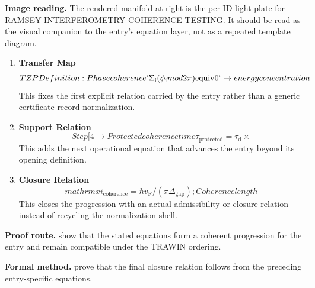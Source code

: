 \begin{samepage}
\noindent\begin{minipage}[t]{0.45\linewidth}
\vspace{0pt}
\raggedright
\scriptsize\textbf{Image reading.} The rendered manifold at right is the per-ID light plate for RAMSEY INTERFEROMETRY COHERENCE TESTING. It should be read as the visual companion to the entry's equation layer, not as a repeated template diagram.\par
\end{minipage}\hfill
\begin{minipage}[t]{0.53\linewidth}
\vspace*{-0.10in}
\raggedright
{}
\end{minipage}
\end{samepage}

\clearpage


\begin{enumerate}[leftmargin=1.6em,itemsep=9pt,topsep=6pt]
\item \textbf{Transfer Map}
\[
TZP Definition: Phase coherence `\Sigma_{\mathrm{i}}(\phi_{\mathrm{i}} mod 2\pi) \mathrm{equiv} 0` \to energy concentration
\]
This fixes the first explicit relation carried by the entry rather than a generic certificate record normalization.

\item \textbf{Support Relation}
\[
Step[4 \to Protected coherence time \tau_{\mathrm{protected}} = \tau_{\mathrm{d}} \times
\]
This adds the next operational equation that advances the entry beyond its opening definition.

\item \textbf{Closure Relation}
\[
mathrm{xi}_{\mathrm{coherence}} = \hbar v_{\mathrm{F}}/(\pi \Delta_{\mathrm{gap}}); Coherence length
\]
This closes the progression with an actual admissibility or closure relation instead of recycling the normalization shell.
\end{enumerate}

\textbf{Proof route.} show that the stated equations form a coherent progression for the entry and remain compatible under the TRAWIN ordering.

\textbf{Formal method.} prove that the final closure relation follows from the preceding entry-specific equations.


